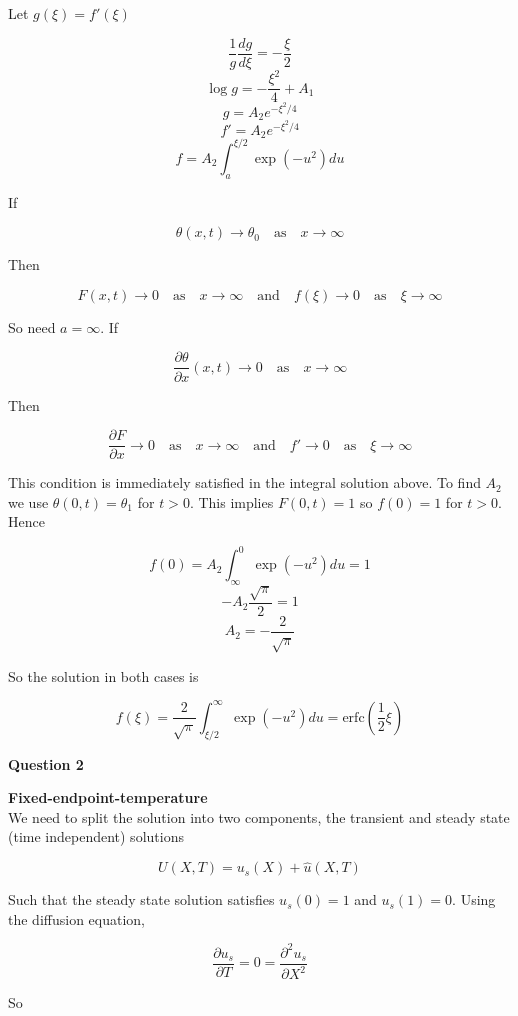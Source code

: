 \documentclass[12pt]{extarticle}
\begin{document}
Let $g(\xi) = f'(\xi)$

$$\frac{1}{g}\frac{dg}{d\xi} = -\frac{\xi}{2}$$
$$\log g = -\frac{\xi^2}{4} + A_1$$
$$g = A_2e^{-\xi^2/4  }$$
$$f' = A_2e^{-\xi^2/4  }$$
$$f = A_2 \int_a^{\xi/2} \exp(-u^2)du$$

If 

$$\theta(x,t) \rightarrow \theta_0 \quad \mathrm{as} \quad x\rightarrow \infty$$

Then 

$$F(x,t) \rightarrow 0 \quad \mathrm{as} \quad x\rightarrow \infty \quad \mathrm{and} \quad f(\xi) \rightarrow 0 \quad \mathrm{as} \quad \xi\rightarrow \infty$$

So need $a = \infty$. If 

$$\frac{\partial \theta }{\partial x}(x,t) \rightarrow 0 \quad\mathrm{as} \quad x \rightarrow \infty$$

Then 
 
$$\frac{\partial F}{\partial x} \rightarrow 0 \quad \mathrm{as} \quad x \rightarrow \infty \quad \mathrm{and} \quad f' \rightarrow 0 \quad \mathrm{as} \quad \xi \rightarrow \infty$$

This condition is immediately satisfied in the integral solution above. To find $A_2$ we use $\theta(0,t)  = \theta_1$  for $t > 0$. This implies $F(0,t) = 1$ so $f(0) = 1$ for $t > 0$. Hence

$$f(0) = A_2 \int_\infty^0 \exp(-u^2)du = 1$$
$$-A_2 \frac{\sqrt{\pi}}{2} = 1$$
$$A_2 = -\frac{2}{\sqrt{\pi}}$$

So the solution in both cases is 

$$f(\xi) = \frac{2}{\sqrt{\pi}} \int_{\xi/2}^\infty \exp(-u^2)du = \mathrm{erfc}\left(\frac{1}{2}\xi\right)$$

\begin{center}
\textbf{Question 2}
\end{center}

\textbf{Fixed-endpoint-temperature}\\ 

We need to split the solution into two components, the transient and steady state (time independent) solutions

$$U(X,T) = u_s(X)+\hat{u}(X,T)$$

Such that the steady state solution satisfies $u_s(0) = 1$ and $u_s(1) = 0$. Using the diffusion equation, 

$$\frac{\partial u_s}{\partial T} = 0 = \frac{\partial^2 u_s}{\partial X^2}$$

So 
\end{document}

